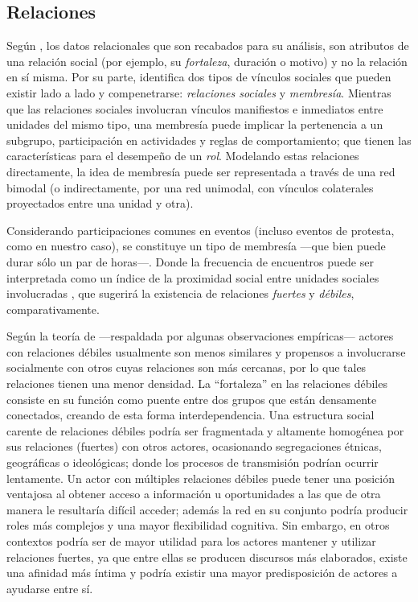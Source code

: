 \documentclass[letterpaper, 11pt]{book}
\theoremstyle{definition}
\theoremstyle{remark}
\begin{document}
\subsection{Relaciones}
\label{sec:relaciones}

Según \citet{1997_Borgatti_2ModeSNA}, los datos relacionales que son recabados para su análisis, son atributos de una relación social (por ejemplo, su \emph{fortaleza}, duración o motivo) y no la relación en sí misma. 
Por su parte, \citet{1988_Breiger_Bipartite} identifica dos tipos de vínculos sociales que pueden existir lado a lado y compenetrarse: \emph{relaciones sociales} y \emph{membresía}. 
Mientras que las relaciones sociales involucran vínculos manifiestos e inmediatos entre unidades del mismo tipo, una membresía puede implicar la pertenencia a un subgrupo, participación en actividades y reglas de comportamiento; que tienen las características para el desempeño de un \emph{rol}. 
Modelando estas relaciones directamente, la idea de membresía puede ser representada a través de una red bimodal (o indirectamente, por una red unimodal, con vínculos colaterales proyectados entre una unidad y otra). 

Considerando participaciones comunes en eventos (incluso eventos de protesta, como en nuestro caso), se constituye un tipo de membresía ---que bien puede durar sólo un par de horas---. 
Donde la frecuencia de encuentros puede ser interpretada como un índice de la proximidad social entre unidades sociales involucradas \citep[245]{1997_Borgatti_2ModeSNA}, que sugerirá la existencia de relaciones \emph{fuertes} y \emph{débiles}, comparativamente. 

Según la teoría de \citet{1983_Granovetter_WeakTies} ---respaldada por algunas observaciones empíricas--- actores con relaciones débiles usualmente son menos similares y propensos a involucrarse socialmente con otros cuyas relaciones son más cercanas, por lo que tales relaciones tienen una menor densidad. 
La ``fortaleza'' en las relaciones débiles consiste en su función como puente entre dos grupos que están densamente conectados, creando de esta forma interdependencia. 
Una estructura social carente de relaciones débiles podría ser fragmentada y altamente homogénea por sus relaciones (fuertes) con otros actores, ocasionando segregaciones étnicas, geográficas o ideológicas; donde los procesos de transmisión podrían ocurrir lentamente. 
Un actor con múltiples relaciones débiles puede tener una posición ventajosa al obtener acceso a información u oportunidades a las que de otra manera le resultaría difícil acceder; además la red en su conjunto podría producir roles más complejos y una mayor flexibilidad cognitiva. 
Sin embargo, en otros contextos podría ser de mayor utilidad para los actores mantener y utilizar relaciones fuertes, ya que entre ellas se producen discursos más elaborados, existe una afinidad más íntima y podría existir una mayor predisposición de actores a ayudarse entre sí. 
\end{document}

